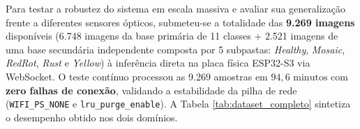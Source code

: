 \documentclass[12pt]{article}
\begin{document}
Para testar a robustez do sistema em escala massiva e avaliar sua generalização frente a diferentes sensores ópticos, submeteu-se a totalidade das \textbf{9.269 imagens} disponíveis (6.748 imagens da base primária de 11 classes + 2.521 imagens de uma base secundária independente composta por 5 subpastas: \textit{Healthy}, \textit{Mosaic}, \textit{RedRot}, \textit{Rust} e \textit{Yellow}) à inferência direta na placa física ESP32-S3 via WebSocket. O teste contínuo processou as 9.269 amostras em $94,6\text{ minutos}$ com \textbf{zero falhas de conexão}, validando a estabilidade da pilha de rede (\texttt{WIFI\_PS\_NONE} e \texttt{lru\_purge\_enable}). A Tabela \ref{tab:dataset_completo} sintetiza o desempenho obtido nos dois domínios.

\begin{table}[htbp]
\centering
\caption{Desempenho do ESP32-S3 no Dataset Completo (9.269 Imagens: Primário vs. Secundário)}
\label{tab:dataset_completo}
\end{table}
\end{document}
